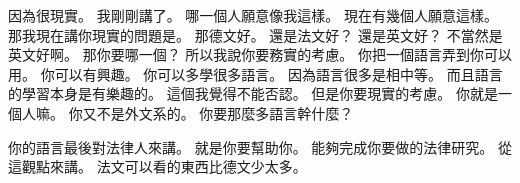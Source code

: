 \hypertarget{w01:cue:4105}{}因為很現實。
\hypertarget{w01:cue:4106}{}我剛剛講了。
\hypertarget{w01:cue:4107}{}哪一個人願意像我這樣。
\hypertarget{w01:cue:4108}{}現在有幾個人願意這樣。
\hypertarget{w01:cue:4109}{}那我現在講你現實的問題是。
\hypertarget{w01:cue:4110}{}那德文好。
\hypertarget{w01:cue:4111}{}還是法文好？
\hypertarget{w01:cue:4112}{}還是英文好？
\hypertarget{w01:cue:4113}{}不當然是英文好啊。
\hypertarget{w01:cue:4114}{}那你要哪一個？
\hypertarget{w01:cue:4115}{}所以我說你要務實的考慮。
\hypertarget{w01:cue:4116}{}你把一個語言弄到你可以用。
\hypertarget{w01:cue:4117}{}你可以有興趣。
\hypertarget{w01:cue:4118}{}你可以多學很多語言。
\hypertarget{w01:cue:4119}{}因為語言很多是相中等。
\hypertarget{w01:cue:4120}{}而且語言的學習本身是有樂趣的。
\hypertarget{w01:cue:4121}{}這個我覺得不能否認。
\hypertarget{w01:cue:4122}{}但是你要現實的考慮。
\hypertarget{w01:cue:4123}{}你就是一個人嘛。
\hypertarget{w01:cue:4124}{}你又不是外文系的。
\hypertarget{w01:cue:4125}{}你要那麼多語言幹什麼？

\hypertarget{w01:cue:4126}{}你的語言最後對法律人來講。
\hypertarget{w01:cue:4127}{}就是你要幫助你。
\hypertarget{w01:cue:4128}{}能夠完成你要做的法律研究。
\hypertarget{w01:cue:4129}{}從這觀點來講。
\hypertarget{w01:cue:4130}{}法文可以看的東西比德文少太多。

